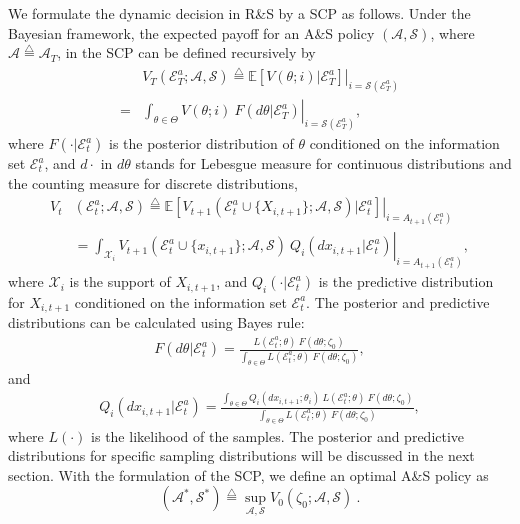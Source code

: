 \documentclass[journal]{IEEEtran}
\newcommand{\ed}{\stackrel{\triangle}{=}}
\begin{document}
   We formulate the dynamic decision in R\&S by a SCP as follows. 
   Under the Bayesian framework, the expected payoff for an A\&S policy $(\mathcal{A},\mathcal{S})$, where $\mathcal{A}\ed\mathcal{A}_T$, in the SCP can be defined recursively by 
   \begin{align*}\label{s1} &V_T(\mathcal{E}_T^a;\mathcal{A},\mathcal{S})\ed\left.\mathbb{E}\left[ V(\theta;i)|\mathcal{E}_T^a\right]\right|_{i=\mathcal{S}(\mathcal{E}_T^a)}\\
   =&\left.\int_{\theta\in \Theta} V(\theta;i)~ F(d\theta|\mathcal{E}_T^a)\right|_{i=\mathcal{S}(\mathcal{E}_T^a)},
   \end{align*}
  where  $F(\cdot|\mathcal{E}_t^a)$ is the posterior distribution of $\theta$ conditioned on the information set $\mathcal{E}_t^a$, and  $d\cdot$ in $d\theta$ stands for Lebesgue measure for continuous distributions and the counting measure for discrete distributions,
  \begin{equation*}
    \begin{aligned}\label{s2} V_{t}&(\mathcal{E}_{t}^a;\mathcal{A},\mathcal{S})\ed\left.\mathbb{E}\left[ V_{t+1}(\mathcal{E}_{t}^a\cup\{X_{i,t+1}\};\mathcal{A},\mathcal{S})|\mathcal{E}_{t}^a\right]\right|_{i=A_{t+1}(\mathcal{E}_{t}^a)}\\
    &=\left.\int_{\mathcal{X}_i}V_{t+1}(\mathcal{E}_{t}^a\cup\{x_{i,t+1}\};\mathcal{A},\mathcal{S})~ Q_i(d x_{i,t+1}|\mathcal{E}_{t}^a)\right|_{i=A_{t+1}(\mathcal{E}_{t}^a)},
    \end{aligned} 
    \end{equation*}
 where $\mathcal{X}_i$ is the support of $X_{i,t+1}$, and $Q_i(\cdot|\mathcal{E}_{t}^a)$  is the predictive distribution for $X_{i,t+1}$ conditioned on the information set $\mathcal{E}_{t}^a$. The posterior and predictive distributions can be calculated using Bayes rule:
 \begin{align}\label{pd1}
 F(d\theta|\mathcal{E}_t^a)=\frac{L(\mathcal{E}_t^a;\theta)~ F(d\theta;\zeta_0)}{\int_{\theta\in\Theta}L(\mathcal{E}_t^a;\theta) ~F(d\theta;\zeta_0)},
 \end{align}
 and
 \begin{align}\label{prd1}
 Q_i(d x_{i,t+1}|\mathcal{E}_t^a)=\frac{\int_{\theta\in\Theta} Q_i(d x_{i,t+1};\theta_i)~L(\mathcal{E}_t^a;\theta)~ F(d\theta;\zeta_0)}{\int_{\theta\in\Theta}L(\mathcal{E}_t^a;\theta) ~F(d\theta;\zeta_0)},
 \end{align}
 where $L(\cdot)$ is the likelihood of the samples. The  posterior and predictive distributions for specific sampling distributions will be discussed in the next section. 
 With the formulation of the SCP, we define an optimal A\&S policy as  
 \begin{equation}\label{sp}
(\mathcal{A}^{*},\mathcal{S}^{*})\ed\sup_{\mathcal{A},\mathcal{S}}V_0(\zeta_0;\mathcal{A},\mathcal{S})~.
 \end{equation} 
\end{document}
